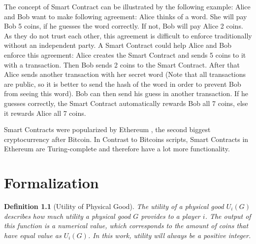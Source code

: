 \documentclass{cacthesis}
\newtheorem{definition}{Definition}
\begin{document}
The concept of Smart Contract can be illustrated by the following example: Alice and Bob want to make following agreement: Alice thinks of a word. She will pay Bob 5 coins, if he guesses the word correctly. If not, Bob will pay Alice 2 coins. As they do not trust each other, this agreement is difficult to enforce traditionally without an independent party. A Smart Contract could help Alice and Bob enforce this agreement: Alice creates the Smart Contract and sends 5 coins to it with a transaction. Then Bob sends 2 coins to the Smart Contract. After that Alice sends another transaction with her secret word (Note that all transactions are public, so it is better to send the hash of the word in order to prevent Bob from seeing this word). Bob can then send his guess in another transaction. If he guesses correctly, the Smart Contract automatically rewards Bob all 7 coins, else it rewards Alice all 7 coins.\newline

Smart Contracts were popularized by Ethereum \cite{buterin_ethereum_nodate}, the second biggest cryptocurrency after Bitcoin. In Contrast to Bitcoins scripts, Smart Contracts in Ethereum are Turing-complete and therefore have a lot more functionality.
\chapter{Formalization}
\label{cha:formalizations}


\begin{definition}[Utility of Physical Good]
\label{def:utility-function}
The utility of a physical good $U_i(G)$ describes how much utility a physical good $G$ provides to a player $i$. The output of this function is a numerical value, which corresponds to the amount of coins that have equal value as $U_i(G)$. In this work, utility will always be a positive integer.
\end{definition}
\end{document}
